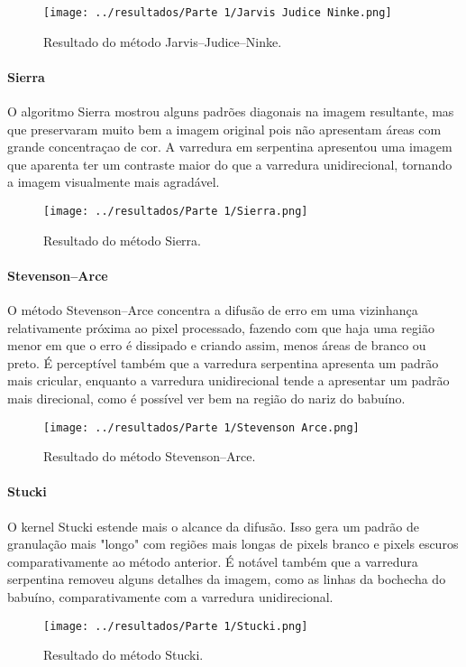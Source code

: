 \documentclass[12pt,a4paper]{article}
\begin{document}
\begin{figure}[H]
  \centering
  \texttt{[image: ../resultados/Parte 1/Jarvis Judice Ninke.png]}
  \caption{Resultado do método Jarvis–Judice–Ninke.}
  \label{fig:jjn}
\end{figure}

\paragraph{Sierra}
O algoritmo Sierra mostrou alguns padrões diagonais na imagem resultante, mas que preservaram muito bem a imagem original pois não apresentam áreas com grande concentraçao de cor. A varredura em serpentina apresentou uma imagem que aparenta ter um contraste maior do que a varredura unidirecional, tornando a imagem visualmente mais agradável.

\begin{figure}[H]
  \centering
  \texttt{[image: ../resultados/Parte 1/Sierra.png]}
  \caption{Resultado do método Sierra.}
  \label{fig:sierra}
\end{figure}


\paragraph{Stevenson–Arce}
O método Stevenson–Arce concentra a difusão de erro em uma vizinhança relativamente próxima ao pixel processado, fazendo com que haja uma região menor em que o erro é dissipado e criando assim, menos áreas de branco ou preto. É perceptível também que a varredura serpentina apresenta um padrão mais cricular, enquanto a varredura unidirecional tende a apresentar um padrão mais direcional, como é possível ver bem na região do nariz do babuíno.

\begin{figure}[H]
  \centering
  \texttt{[image: ../resultados/Parte 1/Stevenson Arce.png]}
  \caption{Resultado do método Stevenson–Arce.}
  \label{fig:stevenson}
\end{figure}

\paragraph{Stucki}
O kernel Stucki estende mais o alcance da difusão. Isso gera um padrão de granulação mais "longo" com regiões mais longas de pixels branco e pixels escuros comparativamente ao método anterior. É notável também que a varredura serpentina removeu alguns detalhes da imagem, como as linhas da bochecha do babuíno, comparativamente com a varredura unidirecional.
\begin{figure}[H]
  \centering
  \texttt{[image: ../resultados/Parte 1/Stucki.png]}
  \caption{Resultado do método Stucki.}
  \label{fig:stucki}
\end{figure}
\end{document}
